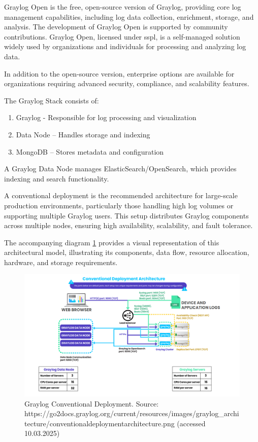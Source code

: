 \documentclass[../main.tex]{subfiles}
\begin{document}
Graylog Open is the free, open-source version of Graylog, providing core log management capabilities, including log data collection, enrichment, storage, and analysis. The development of Graylog Open is supported by community contributions. Graylog Open, licensed under \gls{sspl}, is a self-managed solution widely used by organizations and individuals for processing and analyzing log data. 

In addition to the open-source version, enterprise options are available for organizations requiring advanced security, compliance, and scalability features.

The Graylog Stack consists of:  

\begin{enumerate}
    \item{Graylog} - Responsible for log processing and visualization 
    \item{Data Node} – Handles storage and indexing
    \item{MongoDB} – Stores metadata and configuration
\end{enumerate} 

A Graylog Data Node manages ElasticSearch/OpenSearch, which provides indexing and search functionality.  

A conventional deployment is the recommended architecture for large-scale production environments, particularly those handling high log volumes or supporting multiple Graylog users. This setup distributes Graylog components across multiple nodes, ensuring high availability, scalability, and fault tolerance.  

The accompanying diagram \ref{fig:graylog_deployment} provides a visual representation of this architectural model, illustrating its components, data flow, resource allocation, hardware, and storage requirements.

\begin{figure}[H]
    \centering
    \includegraphics[scale=0.35]{img/2-background/graylog/deployment.png}
    \caption{Graylog Conventional Deployment. Source: https://go2docs.graylog.org/current/resources/images/graylog\_architecture/conventionaldeploymentarchitecture.png (accessed 10.03.2025)}
    \label{fig:graylog_deployment}
\end{figure}
\end{document}

